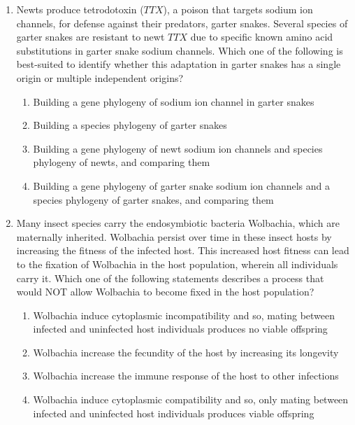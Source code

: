 \documentclass[journal]{IEEEtran}
\begin{document}
\begin{enumerate}
    \item Newts produce tetrodotoxin ($TTX$), a poison that targets sodium ion channels, for defense against their predators, garter snakes.
Several species of garter snakes are resistant to newt $TTX$ due to specific known amino acid substitutions in garter snake sodium channels.
Which one of the following is best-suited to identify whether this adaptation in garter snakes has a single origin or multiple independent origins?
\begin{enumerate}
        \item Building a gene phylogeny of sodium ion channel in garter snakes
        \item Building a species phylogeny of garter snakes
        \item Building a gene phylogeny of newt sodium ion channels and species phylogeny of newts, and comparing them
        \item Building a gene phylogeny of garter snake sodium ion channels and a species phylogeny of garter snakes, and comparing them
    \end{enumerate}

    \item Many insect species carry 
the endosymbiotic bacteria Wolbachia, which are maternally inherited. Wolbachia persist over time in these insect hosts by increasing the fitness of the infected host.
This increased host fitness can lead to the fixation of Wolbachia in the host population, wherein all individuals carry it.
Which one of the following statements describes a process that would NOT allow Wolbachia to become fixed in the host population?
\begin{enumerate}
        \item Wolbachia induce cytoplasmic incompatibility and so, mating between infected and uninfected host individuals produces no viable offspring
        \item Wolbachia increase the fecundity of the host by increasing its longevity
        \item Wolbachia increase the immune response of the host to other infections
        \item Wolbachia induce cytoplasmic compatibility and so, only mating between infected and uninfected host individuals produces viable offspring
    \end{enumerate}
    

\end{enumerate}
\end{document}
